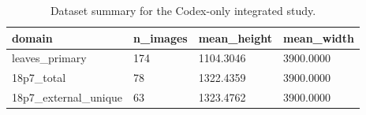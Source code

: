 \begin{table}[t]
\centering
\caption{Dataset summary for the Codex-only integrated study.}
\label{tab:dataset}
\scriptsize
\begin{tabular}{llll}
\toprule
domain & n\_images & mean\_height & mean\_width \\
\midrule
leaves\_primary & 174 & 1104.3046 & 3900.0000 \\
18p7\_total & 78 & 1322.4359 & 3900.0000 \\
18p7\_external\_unique & 63 & 1323.4762 & 3900.0000 \\
\bottomrule
\end{tabular}
\end{table}
